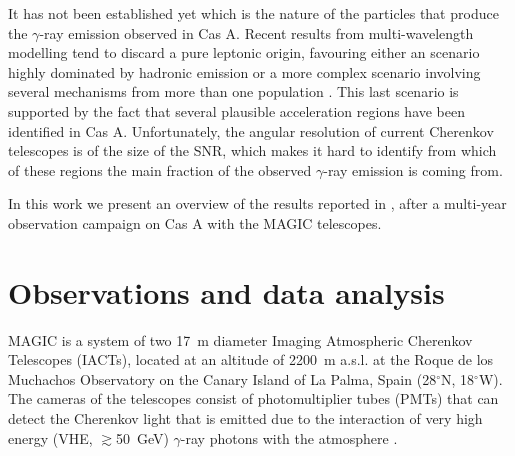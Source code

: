 \documentclass{PoS}
\begin{document}
It has not been established yet which is the nature of the particles that produce the $\gamma$-ray emission observed in Cas A. Recent results from multi-wavelength modelling tend to discard a pure leptonic origin, favouring either an scenario highly dominated by hadronic emission or a more complex scenario involving several mechanisms from more than one population \cite{Berezhko_2003,yuan_2013,Vink_2003,Saha_2014,Zirakashvili_2014}.
This last scenario is supported by the fact that several plausible acceleration regions have been identified in Cas A. 
Unfortunately, the angular resolution of current Cherenkov telescopes is of the size of the SNR, which makes it hard to identify from which of these regions the main fraction of the observed $\gamma$-ray emission is coming from.

In this work we present an overview of the results reported in \cite{THE_PAPER}, after a multi-year observation campaign on Cas A with the MAGIC telescopes.



\section{Observations and data analysis}
\label{sect:observations}


MAGIC is a system of two 17~m diameter Imaging Atmospheric Cherenkov Telescopes (IACTs), located at an altitude of 2200~m a.s.l. at the Roque de los Muchachos Observatory on the Canary Island of La Palma, Spain (28$^\circ$N, 18$^\circ$W). The cameras of the telescopes consist of photomultiplier tubes (PMTs) that can detect the Cherenkov light that is emitted due to the interaction of very high energy (VHE, $\gtrsim$50~GeV) $\gamma$-ray photons with the atmosphere \cite{Magic_performanceII}.
\end{document}
